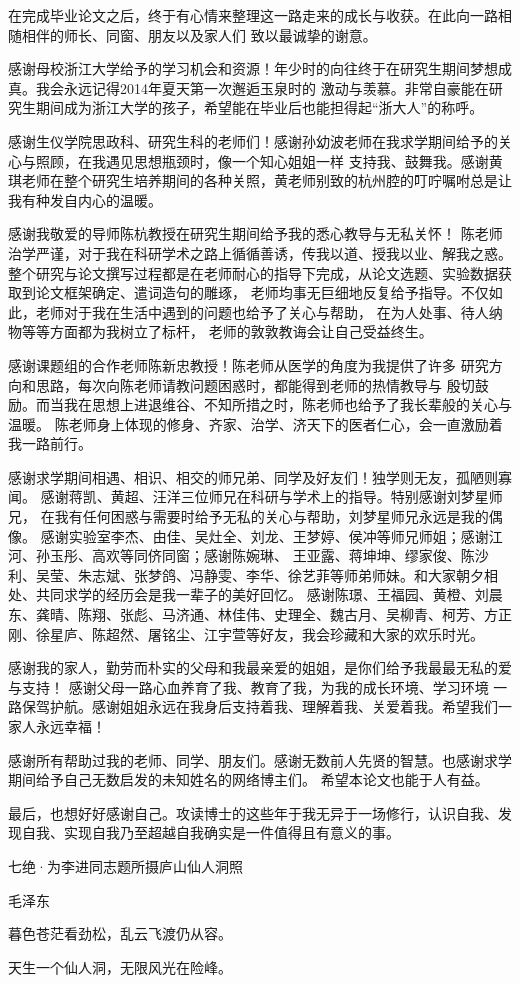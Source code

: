 \cleardoublepage
{}

在完成毕业论文之后，终于有心情来整理这一路走来的成长与收获。在此向一路相随相伴的师长、同窗、朋友以及家人们
致以最诚挚的谢意。

感谢母校浙江大学给予的学习机会和资源！年少时的向往终于在研究生期间梦想成真。我会永远记得2014年夏天第一次邂逅玉泉时的
激动与羡慕。非常自豪能在研究生期间成为浙江大学的孩子，希望能在毕业后也能担得起“浙大人”的称呼。

感谢生仪学院思政科、研究生科的老师们！感谢孙幼波老师在我求学期间给予的关心与照顾，在我遇见思想瓶颈时，像一个知心姐姐一样
支持我、鼓舞我。感谢黄琪老师在整个研究生培养期间的各种关照，黄老师别致的杭州腔的叮咛嘱咐总是让我有种发自内心的温暖。

感谢我敬爱的导师陈杭教授在研究生期间给予我的悉心教导与无私关怀！
陈老师治学严谨，对于我在科研学术之路上循循善诱，传我以道、授我以业、解我之惑。
整个研究与论文撰写过程都是在老师耐心的指导下完成，从论文选题、实验数据获取到论文框架确定、遣词造句的雕琢，
老师均事无巨细地反复给予指导。不仅如此，老师对于我在生活中遇到的问题也给予了关心与帮助，
在为人处事、待人纳物等等方面都为我树立了标杆，
老师的敦敦教诲会让自己受益终生。

感谢课题组的合作老师陈新忠教授！陈老师从医学的角度为我提供了许多
研究方向和思路，每次向陈老师请教问题困惑时，都能得到老师的热情教导与
殷切鼓励。而当我在思想上进退维谷、不知所措之时，陈老师也给予了我长辈般的关心与温暖。
陈老师身上体现的修身、齐家、治学、济天下的医者仁心，会一直激励着我一路前行。

感谢求学期间相遇、相识、相交的师兄弟、同学及好友们！独学则无友，孤陋则寡闻。
感谢蒋凯、黄超、汪洋三位师兄在科研与学术上的指导。特别感谢刘梦星师兄，
在我有任何困惑与需要时给予无私的关心与帮助，刘梦星师兄永远是我的偶像。
感谢实验室李杰、由佳、吴灶全、刘龙、王梦婷、侯冲等师兄师姐；感谢江河、孙玉彤、高欢等同侪同窗；感谢陈婉琳、
王亚露、蒋坤坤、缪家俊、陈沙利、吴莹、朱志斌、张梦鸽、冯静雯、李华、徐艺菲等师弟师妹。和大家朝夕相处、共同求学的经历会是我一辈子的美好回忆。
感谢陈璟、王福园、黄橙、刘晨东、龚晴、陈翔、张彪、马济通、林佳伟、史理全、魏古月、吴柳青、柯芳、方正刚、徐星庐、陈超然、屠铭尘、江宇萱等好友，我会珍藏和大家的欢乐时光。

感谢我的家人，勤劳而朴实的父母和我最亲爱的姐姐，是你们给予我最最无私的爱与支持！
感谢父母一路心血养育了我、教育了我，为我的成长环境、学习环境
一路保驾护航。感谢姐姐永远在我身后支持着我、理解着我、关爱着我。希望我们一家人永远幸福！

感谢所有帮助过我的老师、同学、朋友们。感谢无数前人先贤的智慧。也感谢求学期间给予自己无数启发的未知姓名的网络博主们。
希望本论文也能于人有益。

最后，也想好好感谢自己。攻读博士的这些年于我无异于一场修行，认识自我、发现自我、实现自我乃至超越自我确实是一件值得且有意义的事。

\bigskip
\centerline{七绝·为李进同志题所摄庐山仙人洞照}
\centerline{毛泽东}
\centerline{暮色苍茫看劲松，乱云飞渡仍从容。}
\centerline{天生一个仙人洞，无限风光在险峰。}


